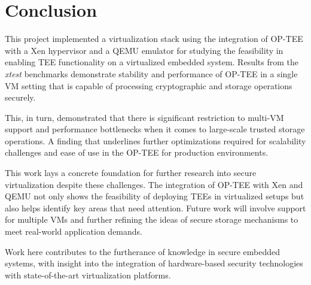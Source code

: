 \documentclass[acmtog]{acmart}
\begin{document}
\section{Conclusion}

This project implemented a virtualization stack using the integration of OP-TEE with a Xen hypervisor and a QEMU emulator for studying the feasibility in enabling TEE functionality on a virtualized embedded system. Results from the \textit{xtest} benchmarks demonstrate stability and performance of OP-TEE in a single VM setting that is capable of processing cryptographic and storage operations securely.

This, in turn, demonstrated that there is significant restriction to multi-VM support and performance bottlenecks when it comes to large-scale trusted storage operations. A finding that underlines further optimizations required for scalability challenges and ease of use in the OP-TEE for production environments.

This work lays a concrete foundation for further research into secure virtualization despite these challenges. The integration of OP-TEE with Xen and QEMU not only shows the feasibility of deploying TEEs in virtualized setups but also helps identify key areas that need attention. Future work will involve support for multiple VMs and further refining the ideas of secure storage mechanisms to meet real-world application demands.

Work here contributes to the furtherance of knowledge in secure embedded systems, with insight into the integration of hardware-based security technologies with state-of-the-art virtualization platforms.





\end{document}
